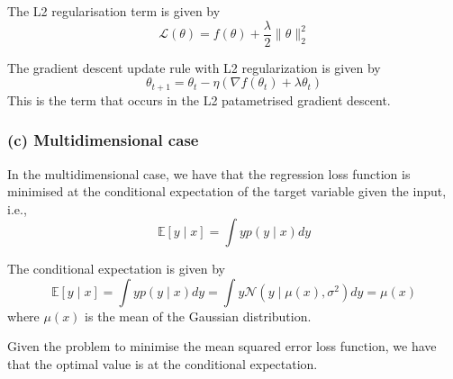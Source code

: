 The L2 regularisation term is given by
\begin{equation*}
      \mathcal{L}(\theta) = f(\theta) + \frac{\lambda}{2} \| \theta \|_2^2
\end{equation*}

The gradient descent update rule with L2 regularization is given by
\begin{equation*}
      \theta_{t+1} = \theta_t - \eta \left( \nabla f(\theta_t) + \lambda \theta_t \right)
\end{equation*}
This is the term that occurs in the L2 patametrised gradient descent.

\subsubsection*{(c) Multidimensional case}

In the multidimensional case, we have that the regression loss function is minimised at the conditional expectation of the target variable given the input, i.e.,
\begin{equation*}
      \mathbb{E} \left[ y \mid x \right] = \int y p(y \mid x) dy
\end{equation*}

The conditional expectation is given by
\begin{equation*}
      \mathbb{E} \left[ y \mid x \right] = \int y p(y \mid x) dy = \int y \mathcal{N} \left( y \mid \mu(x), \sigma^2 \right) dy = \mu(x)
\end{equation*}
where \(\mu(x)\) is the mean of the Gaussian distribution.

Given the problem to minimise the mean squared error loss function, we have that the optimal value is at the conditional expectation.

